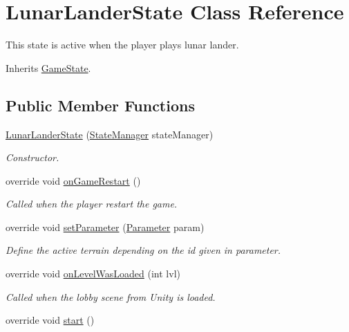 \hypertarget{class_lunar_lander_state}{\section{Lunar\-Lander\-State Class Reference}
\label{class_lunar_lander_state}
}


This state is active when the player plays lunar lander. 




Inherits \hyperlink{class_game_state}{Game\-State}.

\subsection*{Public Member Functions}
\begin{DoxyCompactItemize}
\item 
\hyperlink{class_lunar_lander_state_abc2df347c44af99680c6bc9f7e62bd97}{Lunar\-Lander\-State} (\hyperlink{class_state_manager}{State\-Manager} state\-Manager)
\begin{DoxyCompactList}\small\item\em Constructor.\end{DoxyCompactList}\item 
override void \hyperlink{class_lunar_lander_state_aaae12c9c7ab7ead591e8445d6752f0a7}{on\-Game\-Restart} ()
\begin{DoxyCompactList}\small\item\em Called when the player restart the game.\end{DoxyCompactList}\item 
override void \hyperlink{class_lunar_lander_state_a4692ec796046e9d058e1ec63b2d82f50}{set\-Parameter} (\hyperlink{class_parameter}{Parameter} param)
\begin{DoxyCompactList}\small\item\em Define the active terrain depending on the id given in parameter.\end{DoxyCompactList}\item 
override void \hyperlink{class_lunar_lander_state_a048d7449e1d9429bbe14652d35ae9dec}{on\-Level\-Was\-Loaded} (int lvl)
\begin{DoxyCompactList}\small\item\em Called when the lobby scene from Unity is loaded.\end{DoxyCompactList}\item 
override void \hyperlink{class_lunar_lander_state_a9aa6e9fab93a7566b6727971eca0a225}{start} ()

\end{DoxyCompactItemize}
